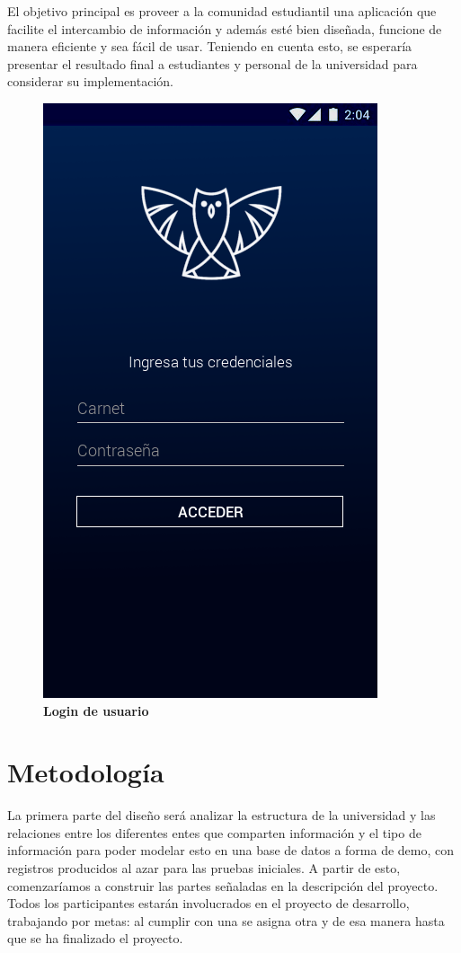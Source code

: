 \documentclass[12pt]{article}
\begin{document}
El objetivo principal es proveer a la comunidad estudiantil una aplicación que facilite el intercambio de información y además esté bien diseñada, funcione de manera eficiente y sea fácil de usar. Teniendo en cuenta esto, se esperaría presentar el resultado final a estudiantes y personal de la universidad para considerar su implementación.

\begin{figure}[H]
	\caption{\textbf{Login de usuario}}
	\includegraphics[scale=0.50]{img/1.png}
	\centering
\end{figure}

\section{Metodología} 


La primera parte del diseño será analizar la estructura de la universidad y las relaciones entre los diferentes entes que comparten información y el tipo de información para poder modelar esto en una base de datos a forma de demo, con registros producidos al azar para las pruebas iniciales. A partir de esto, comenzaríamos a construir las partes señaladas en la descripción del proyecto. Todos los participantes estarán involucrados en el proyecto de desarrollo, trabajando por metas: al cumplir con una se asigna otra y de esa manera hasta que se ha finalizado el proyecto.
\end{document}
